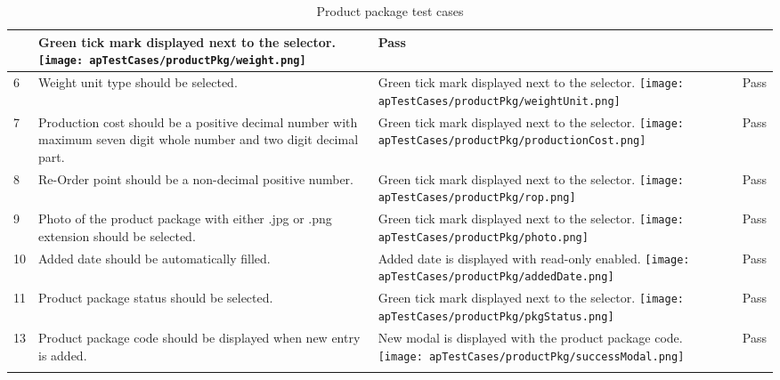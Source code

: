 \documentclass[12pt]{report}
\begin{document}
\begin{longtable}{ | p{1cm} | p{5cm} | p{5cm} | p{2cm} | }
	             &
	Green tick mark displayed next to the selector.\newline
	\texttt{[image: apTestCases/productPkg/weight.png]}
	             &
	Pass                                                                      \\
	\hline
	6
	             &
	Weight unit type should be selected.
	             &
	Green tick mark displayed next to the selector.\newline
	\texttt{[image: apTestCases/productPkg/weightUnit.png]}
	             &
	Pass                                                                      \\
	\hline
	7
	             &
	Production cost should be a positive decimal number with maximum seven digit whole number and two digit decimal part.
	             &
	Green tick mark displayed next to the selector.\newline
	\texttt{[image: apTestCases/productPkg/productionCost.png]}
	             &
	Pass                                                                      \\
	\hline
	8
	             &
	Re-Order point should be a non-decimal positive number.
	             &
	Green tick mark displayed next to the selector.\newline
	\texttt{[image: apTestCases/productPkg/rop.png]}
	             &
	Pass                                                                      \\
	\hline
	9
	             &
	Photo of the product package with either .jpg or .png extension should be selected.
	             &
	Green tick mark displayed next to the selector.\newline
	\texttt{[image: apTestCases/productPkg/photo.png]}
	             &
	Pass                                                                      \\
	\hline
	10
	             &
	Added date should be automatically filled.
	             &
	Added date is displayed with read-only enabled.\newline
	\texttt{[image: apTestCases/productPkg/addedDate.png]}
	             &
	Pass                                                                      \\
	\hline
	11
	             &
	Product package status should be selected.
	             &
	Green tick mark displayed next to the selector.\newline
	\texttt{[image: apTestCases/productPkg/pkgStatus.png]}
	             &
	Pass                                                                      \\
	\hline
	13
	             &
	Product package code should be displayed when new entry is added.
	             &
	New modal is displayed with the product package code.\newline
	\texttt{[image: apTestCases/productPkg/successModal.png]}
	             &
	Pass                                                                      \\
	\hline
	\caption{Product package test cases}
\end{longtable}
\end{document}
